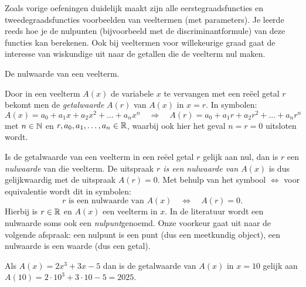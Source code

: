 \documentclass{ximera}
\begin{document}
                                                                                                                                                                                                                                                                                                                                                            
 
Zoals vorige oefeningen duidelijk maakt zijn alle eerstegraadsfuncties en tweedegraadsfuncties voorbeelden van veeltermen (met parameters). 
Je leerde reeds hoe je de nulpunten (bijvoorbeeld met de discriminantformule) van deze functies kan berekenen. 
Ook bij veeltermen voor willekeurige graad gaat de interesse van wiskundige uit naar de getallen die de veelterm nul maken. 


\begin{definition} De nulwaarde van een veelterm. 


    Door in een veelterm $A(x)$ de variabele $x$ te vervangen met een reëel getal $r$ bekomt men de \textit{getalwaarde} $A(r)$ van $A(x)$ in $x = r$.  In symbolen:
    \[
    A(x) = a_0 + a_1x + a_2x^2 + \dots + a_n x^n \quad 
    \Rightarrow
    \quad A(r) = a_0 + a_1 r + a_2r^2 + \dots + a_n r^n
    \]
    met $n \in \mathbb{N}$ en $r, a_0, a_1, \ldots, a_n \in \mathbb{R}$, waarbij ook hier het geval $n = r = 0$ uitsloten wordt. %
    
    Is de getalwaarde van een veelterm in een reëel getal $r$ gelijk aan nul, dan is $r$ een \textit{nulwaarde} van die veelterm. De uitspraak {\em $r$ is een nulwaarde van $A(x)$} is dus gelijkwaardig met de uitspraak {\em $A(r) = 0$}. Met behulp van het symbool $\Leftrightarrow$ voor equivalentie wordt dit in symbolen:
    \[
    r \text{ is een nulwaarde van } A(x) \quad \Leftrightarrow \quad A(r) = 0.
    \]
    Hierbij is $r \in \mathbb{R}$ en $A(x)$ een veelterm in $x$. In de literatuur wordt een nulwaarde soms ook een \textit{nulpunt}genoemd. Onze voorkeur gaat uit naar de volgende afspraak: een nulpunt is een punt (dus een meetkundig object), een nulwaarde is een waarde (dus een getal).
    
\end{definition} 
    


\begin{example} 
    Als $A(x) = 2x^3+3x-5$ dan is de getalwaarde van $A(x)$ in $x = 10$ gelijk aan $A(10) = 2\cdot 10^3 + 3 \cdot 10 - 5 = 2025$.
\end{example} 
\end{document}
